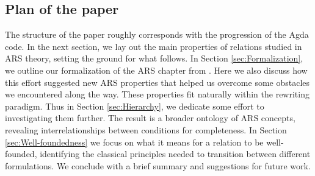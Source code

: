 
\subsection{Plan of the paper}

The structure of the paper roughly corresponds with the progression of the Agda code.
In the next section, we lay out the main properties of relations studied in ARS theory,
setting the ground for what follows.  In Section \ref{sec:Formalization}, we
outline our formalization of the ARS chapter from \cite{Terese}.
Here we also discuss how this effort suggested new ARS properties that helped us overcome some obstacles we encountered along the way.  These properties fit naturally within the rewriting paradigm.  Thus in Section \ref{sec:Hierarchy}, we dedicate some effort to investigating them further.  The result is a broader ontology of ARS concepts, revealing interrelationships between conditions for completeness.  In Section \ref{sec:Well-foundedness} we focus on what it means for a relation to be well-founded, identifying the classical principles needed to transition between different formulations.
We conclude with a brief summary and suggestions for future work.
